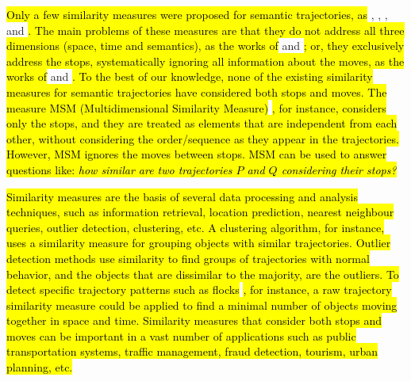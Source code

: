 \documentclass[12pt]{article}
\begin{document}
\hl{Only a few  similarity measures were proposed for semantic trajectories, as } \cite{Kang:2009:SMT:1529282.1529580}, \cite{Liu:2012:SMM:2442968.2442971}, \cite{Ying:2010:MUS:1867699.1867703}, and \cite{Furtado:TGIS12156}\hl{. The main problems of these measures are that they do not address all three dimensions (space, time and semantics), as the works of }\cite{Kang:2009:SMT:1529282.1529580} and \cite{Liu:2012:SMM:2442968.2442971}\hl{; or, 
they exclusively address the stops, systematically ignoring all information about the moves, as the works of }\cite{Ying:2010:MUS:1867699.1867703} and \cite{Furtado:TGIS12156}\hl{. To the best of our knowledge, none of the existing similarity measures for semantic trajectories have considered both stops and moves. The measure MSM (Multidimensional Similarity Measure) }\citep{Furtado:TGIS12156}\hl{, for instance, considers only the stops, and they are treated as elements that are independent from each other, without considering the order/sequence as they appear in the trajectories. However, MSM ignores the moves between stops. MSM can be used to answer questions like: \emph{how similar are two trajectories $P$ and $Q$ considering their stops?}}

 

\hl{Similarity measures are the basis of several data processing and analysis techniques, such as information retrieval, location prediction, nearest neighbour queries, outlier detection, clustering, etc. A clustering algorithm, for instance, uses a similarity measure for grouping objects with similar trajectories. Outlier detection methods use similarity to find groups of trajectories with normal behavior, and the objects that are dissimilar to the majority, are the outliers. To detect specific trajectory patterns such as flocks }\citep{Laube2005}\hl{, for instance, a raw trajectory similarity measure could be applied to find a minimal number of objects moving together in space and time. Similarity measures that consider both stops and moves can be important in a vast number of applications such as public transportation systems, traffic management, fraud detection, tourism, urban planning, etc. }
\end{document}

